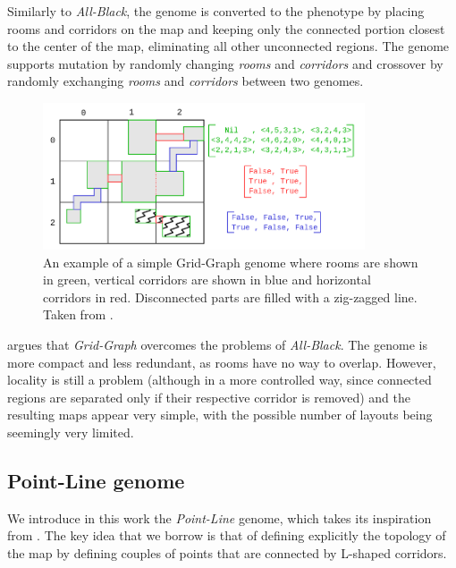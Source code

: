 Similarly to \textit{All-Black}, the genome is converted to the phenotype by placing rooms and corridors on the map and keeping only the connected portion closest to the center of the map, eliminating all other unconnected regions. The genome supports mutation by randomly changing \textit{rooms} and \textit{corridors} and crossover by randomly exchanging \textit{rooms} and \textit{corridors} between two genomes.

\begin{figure}[hbt!]
    \centering
    \includegraphics[width=0.85\textwidth]{images/GridGraph.png}
    \caption[Grid-Graph example]{An example of a simple Grid-Graph genome where rooms are shown in green, vertical corridors are shown in blue and horizontal corridors in red. Disconnected parts are filled with a zig-zagged line. Taken from \cite{bari_evolutionary-based_2023}.}
    \label{fig:grid_graph}
\end{figure}

\citeauthor{bari_evolutionary-based_2023} argues that \textit{Grid-Graph} overcomes the problems of \textit{All-Black}. The genome is more compact and less redundant, as rooms have no way to overlap. However, locality is still a problem (although in a more controlled way, since connected regions are separated only if their respective corridor is removed) and the resulting maps appear very simple, with the possible number of layouts being seemingly very limited.

\subsection{Point-Line genome}
\label{subsec:point_line}

We introduce in this work the \textit{Point-Line} genome, which takes its inspiration from \citet{olsted_interactive_2015}. The key idea that we borrow is that of defining explicitly the topology of the map by defining couples of points that are connected by L-shaped corridors.


